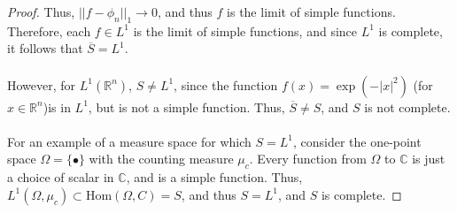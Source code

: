 \documentclass[fontsize=11pt]{scrartcl} %
\numberwithin{equation}{section} %
\numberwithin{figure}{section} %
\numberwithin{table}{section} %
\newcommand{\R}{\mathbb{R}}
\newcommand{\C}{\mathbb{C}}
\begin{document}
\begin{proof}
    Thus, $||f-\phi_n||_1\to 0$, and thus $f$ is the limit of simple functions.
    Therefore, each $f\in L^1$ is the limit of simple functions, and since $L^1$
    is complete, it follows that $\overline{S}=L^1$.
    \\
    \\
    However, for $L^1(\R^n)$, $S\neq L^1$, since the function $f(x) =
    \exp(-|x|^2)$ (for $x\in\R^n$)is in $L^1$, but is not a simple function. Thus,
    $\overline{S}\neq S$, and $S$ is not complete.
    \\
    \\
    For an example of a measure space for which $S=L^1$, consider the one-point
    space $\Omega = \{\bullet\}$ with the counting measure $\mu_c$. Every
    function from $\Omega$ to $\C$ is just a choice of scalar in $\C$, and is a
    simple function. Thus, $L^1(\Omega,\mu_c)\subset \textrm{Hom}(\Omega,C) =
    S$, and thus $S=L^1$, and $S$ is complete.
\end{proof}
\newpage
\end{document}
